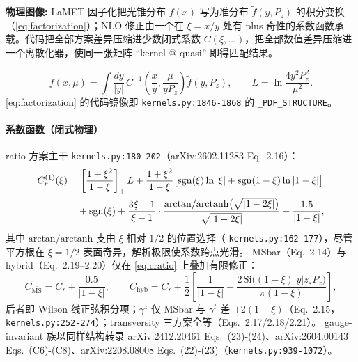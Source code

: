 \documentclass[UTF8]{ctexart}
\begin{document}
\begin{physbox}
\textbf{物理图像:} LaMET 因子化把光锥分布 $f(x)$ 写为准分布 $\tilde f(y,P_z)$
的积分变换（\eqref{eq:factorization}）；NLO 修正由一个在 $\xi=x/y$ 处有
plus 奇性的系数函数承载。代码把全部方案差异压缩进少数闭式系数
$C(\xi,\dots)$，把全部数值差异压缩进一个离散化器，使同一张矩阵
``kernel @ quasi'' 即得匹配结果。
\end{physbox}

\begin{equation}\label{eq:factorization}
f(x,\mu)=\int\frac{dy}{|y|}\,C^{-1}\!\left(\frac{x}{y},\frac{\mu}{yP_z}\right)\tilde f(y,P_z),
\qquad L=\ln\frac{4y^2P_z^2}{\mu^2}.
\end{equation}
\eqref{eq:factorization} 的代码镜像即
\texttt{\nolinkurl{kernels.py:1846-1868}} 的 \texttt{\_PDF\_STRUCTURE}。

\paragraph{系数函数（闭式物理）} ratio 方案主干
\texttt{\nolinkurl{kernels.py:180-202}}（arXiv:2602.11283 Eq.~2.16）：
\begin{align}\label{eq:cratio}
C_r^{(1)}(\xi)&=
\left[\frac{1+\xi^2}{1-\xi}\right]_{+}L
+\frac{1+\xi^2}{1-\xi}\bigl[\mathrm{sgn}(\xi)\ln|\xi|+\mathrm{sgn}(1-\xi)\ln|1-\xi|\bigr]\notag\\
&\quad+\mathrm{sgn}(\xi)+\frac{3\xi-1}{\xi-1}\cdot\frac{\mathrm{arctan}/\mathrm{arctanh}\bigl(\sqrt{|1-2\xi|}\bigr)}{\sqrt{|1-2\xi|}}
-\frac{1.5}{|1-\xi|},
\end{align}
其中 $\mathrm{arctan}/\mathrm{arctanh}$ 支由 $\xi$ 相对 $1/2$ 的位置选择（
\texttt{\nolinkurl{kernels.py:162-177}}），尽管平方根在 $\xi=1/2$ 表面奇异，解析极限使系数跨点光滑。
MSbar（Eq.~2.14）与 hybrid（Eq.~2.19--2.20）仅在 \eqref{eq:cratio} 上叠加有限修正：
\begin{equation}\label{eq:cmsbar}
C_{\overline{\mathrm{MS}}}=C_r+\frac{0.5}{|1-\xi|},\qquad
C_{\mathrm{hyb}}=C_r+\frac12\left[\frac{1}{|1-\xi|}-\frac{2\,\mathrm{Si}\bigl((1-\xi)|y|z_sP_z\bigr)}{\pi(1-\xi)}\right],
\end{equation}
后者即 Wilson 线正弦积分项；$\gamma^z$ 仅 MSbar 与 $\gamma^t$ 差 $+2(1-\xi)$（Eq.~2.15，
\texttt{\nolinkurl{kernels.py:252-274}}）；transversity 三方案全等（Eqs.~2.17/2.18/2.21）。
gauge-invariant 族以同样结构转录 arXiv:2412.20461 Eqs.~(23)-(24)、arXiv:2604.00143
Eqs.~(C6)-(C8)、arXiv:2208.08008 Eqs.~(22)-(23)（\texttt{\nolinkurl{kernels.py:939-1072}}）。
\end{document}
